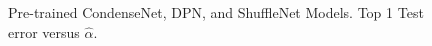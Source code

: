 {\begin{figure}[!htb]
{       \label{fig:dpn-net}
   }
   \caption{
      Pre-trained 
      CondenseNet, DPN, and ShuffleNet
      Models.
      Top 1 Test error versus
      $\hat{\alpha}$.
           }
   \label{fig:still_more_1}
\end{figure}


}

